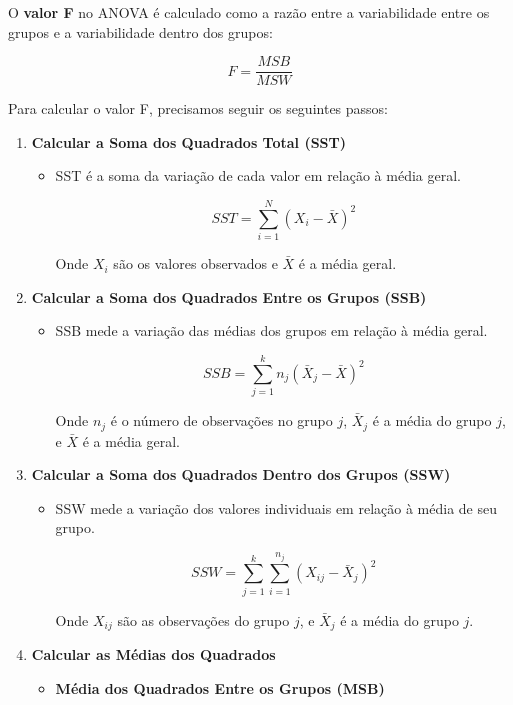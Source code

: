 \documentclass[conference]{IEEEtran}
\begin{document}
O \textbf{valor F} no ANOVA é calculado como a razão entre a variabilidade entre os grupos e a variabilidade dentro dos grupos:

\[
F = \frac{MSB}{MSW}
\]

Para calcular o valor F, precisamos seguir os seguintes passos:

\begin{enumerate}
    \item \textbf{Calcular a Soma dos Quadrados Total (SST)}
    \begin{itemize}
        \item SST é a soma da variação de cada valor em relação à média geral.
        
        \[
        SST = \sum_{i=1}^{N} (X_i - \bar{X})^2
        \]
        
        Onde \( X_i \) são os valores observados e \( \bar{X} \) é a média geral.
     \end{itemize}
     
    \item \textbf{Calcular a Soma dos Quadrados Entre os Grupos (SSB)}
    \begin{itemize}
        \item SSB mede a variação das médias dos grupos em relação à média geral.
        
        \[
        SSB = \sum_{j=1}^{k} n_j (\bar{X}_j - \bar{X})^2
        \]
        
        Onde \( n_j \) é o número de observações no grupo \( j \), \( \bar{X}_j \) é a média do grupo \( j \), e \( \bar{X} \) é a média geral.
    \end{itemize}
    
    \item \textbf{Calcular a Soma dos Quadrados Dentro dos Grupos (SSW)}
    \begin{itemize}
        \item SSW mede a variação dos valores individuais em relação à média de seu grupo.
         
        \[
        SSW = \sum_{j=1}^{k} \sum_{i=1}^{n_j} (X_{ij} - \bar{X}_j)^2
        \]
        
        Onde \( X_{ij} \) são as observações do grupo \( j \), e \( \bar{X}_j \) é a média do grupo \( j \).
    \end{itemize}
    
        \item \textbf{Calcular as Médias dos Quadrados}
    \begin{itemize}
        \item \textbf{Média dos Quadrados Entre os Grupos (MSB)}
        

\end{itemize}
\end{enumerate}
\end{document}
